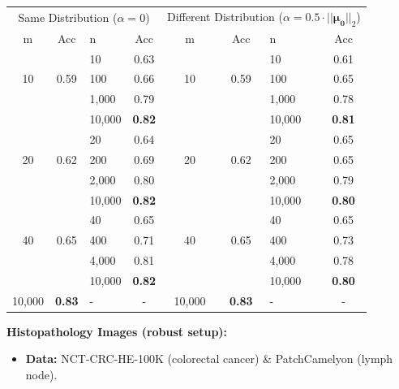 {\begin{minipage}[c]{\textwidth}
    \begin{center}{\fontsize{\txtfontsize}{8} \selectfont \setlength{\tabcolsep}{10pt} \renewcommand{\arraystretch}{0.55} \begin{tabular}{cclccclc}
        \toprule
        \multicolumn{4}{c}{Same Distribution ($\alpha = 0$)} & \multicolumn{4}{c}{Different Distribution ($\alpha = 0.5\cdot ||\boldsymbol{\mu_0}||_2$)} \\
        \cmidrule(lr){1-4} \cmidrule(lr){5-8}
        m & Acc & n & Acc & m & Acc & n & Acc \\
        \midrule 
                &      & 10      & 0.63          &     &      & 10      & 0.61  \\
          10    & 0.59 & 100     & 0.66          & 10  & 0.59 & 100     & 0.65  \\
                &      & 1,000   & 0.79          &     &      & 1,000   & 0.78  \\
                &      & 10,000  & \textbf{0.82} &     &      & 10,000  & \textbf{0.81}  \\
        \midrule
                &      & 20      & 0.64          &     &      & 20      & 0.65  \\
          20    & 0.62 & 200     & 0.69          & 20  & 0.62 & 200     & 0.65  \\
                &      & 2,000   & 0.80          &     &      & 2,000   & 0.79  \\
                &      & 10,000  & \textbf{0.82} &     &      & 10,000  & \textbf{0.80}  \\
        \midrule 
                &      & 40      & 0.65          &     &      & 40      & 0.65  \\
          40    & 0.65 & 400     & 0.71          & 40  & 0.65 & 400     & 0.73  \\
                &      & 4,000   & 0.81          &     &      & 4,000   & 0.78  \\
                &      & 10,000  & \textbf{0.82} &     &      & 10,000  & \textbf{0.80}  \\
        \midrule
         10,000 & \textbf{0.83}   & -       & -  & 10,000 & \textbf{0.83} & - & - \\  
        \bottomrule
      \end{tabular}
    }
  \end{center}

  {\fontsize{\txtfontsize}{10} \selectfont \textbf{\color{title_color} Histopathology Images (robust setup):}}
  \vspace{0.3em}
    {\fontsize{\txtfontsize}{11} \selectfont
    \begin{itemize}
        \item \textbf{Data:} NCT-CRC-HE-100K (colorectal cancer) \& PatchCamelyon (lymph node).
    

\end{itemize}}
\end{minipage}}
